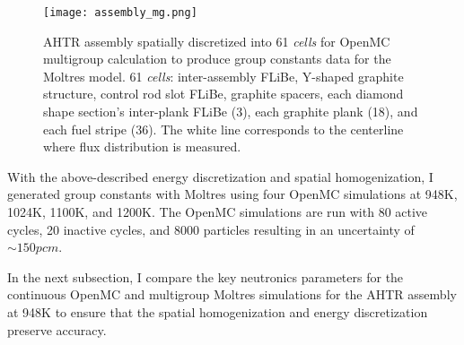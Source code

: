 \begin{figure}[htbp]
    \centering
    \texttt{[image: assembly\_mg.png]}
    \raggedright
    \caption{\acrfull{AHTR} assembly spatially discretized into 
    61 \textit{cells} for OpenMC multigroup calculation to produce group constants 
    data for the Moltres model.
    61 \textit{cells}: inter-assembly \gls{FLiBe}, Y-shaped graphite structure, control 
    rod slot \gls{FLiBe}, graphite spacers, each diamond shape section's inter-plank 
    \gls{FLiBe} (3), each graphite plank (18), and each fuel stripe (36).
     The white line corresponds to the centerline where flux distribution is measured.}
    \label{fig:assembly_mg}
\end{figure}

With the above-described energy discretization and spatial homogenization, I generated 
group constants with Moltres using four OpenMC simulations at 948K, 1024K, 1100K, and 
1200K. 
The OpenMC simulations are run with 80 active cycles, 20 inactive cycles, and 8000 
particles resulting in an uncertainty of $\sim 150pcm$.

In the next subsection, I compare the key neutronics parameters for the continuous 
OpenMC and multigroup Moltres simulations for the \gls{AHTR} assembly at 948K to 
ensure that the spatial homogenization and energy discretization preserve accuracy. 

